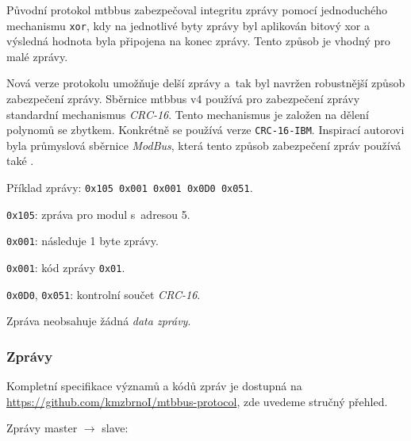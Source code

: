 \begin{enumerate}
Původní protokol \gls{mtbbus} zabezpečoval integritu zprávy pomocí jednoduchého
mechanismu \texttt{xor}, kdy na jednotlivé byty zprávy byl aplikován bitový xor
a výsledná hodnota byla připojena na konec zprávy. Tento způsob je vhodný pro
malé zprávy.

Nová verze protokolu umožňuje delší zprávy a~tak byl navržen robustnější
způsob zabezpečení zprávy. Sběrnice \gls{mtbbus} v4 používá pro zabezpečení
zprávy standardní mechanismus \textit{CRC-16}. Tento mechanismus je
založen na dělení polynomů se zbytkem. Konkrétně se používá verze
\texttt{CRC-16-IBM}. Inspirací autorovi byla průmyslová sběrnice
\textit{ModBus}, která tento způsob zabezpečení zpráv používá také
\cite{modbus-specs}.

\end{enumerate}

Příklad zprávy: \texttt{0x105 0x001 0x001 0x0D0 0x051}.

\begin{compactenum}
\item \texttt{0x105}: zpráva pro modul s~adresou 5.
\item \texttt{0x001}: následuje 1 byte zprávy.
\item \texttt{0x001}: kód zprávy \texttt{0x01}.
\item \texttt{0x0D0}, \texttt{0x051}: kontrolní součet \textit{CRC-16}.
\end{compactenum}

Zpráva neobsahuje žádná \textit{data zprávy}.

\subsubsection{Zprávy} \label{subsub:mtbbus-messages}

Kompletní specifikace významů a kódů zpráv je dostupná na
\url{https://github.com/kmzbrnoI/mtbbus-protocol}, zde uvedeme stručný přehled.

Zprávy master $\rightarrow$ slave:

